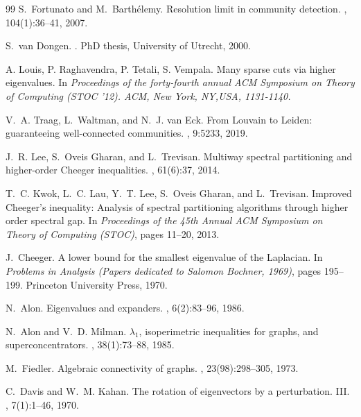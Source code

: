 \documentclass{article}
\theoremstyle{definition}
\theoremstyle{remark}
\begin{document}
\begin{thebibliography}{99}
S.~Fortunato and M.~Barth\'elemy.
\newblock Resolution limit in community detection.
,
  104(1):36--41, 2007.

S.~van Dongen.
.
\newblock PhD thesis, University of Utrecht, 2000.

A. Louis, P. Raghavendra, P. Tetali, S. Vempala.
\newblock Many sparse cuts via higher eigenvalues. 
\newblock In {\em Proceedings of the forty-fourth annual ACM Symposium on Theory of Computing (STOC ’12). ACM, New York, NY,USA, 1131-1140.}

V.~A. Traag, L.~Waltman, and N.~J. van Eck.
\newblock From {L}ouvain to {L}eiden: guaranteeing well-connected communities.
, 9:5233, 2019.

J.~R. Lee, S.~Oveis Gharan, and L.~Trevisan.
\newblock Multiway spectral partitioning and higher-order {C}heeger
  inequalities.
, 61(6):37, 2014.

T.~C. Kwok, L.~C. Lau, Y.~T. Lee, S.~Oveis Gharan, and L.~Trevisan.
\newblock Improved {C}heeger's inequality: Analysis of spectral partitioning
  algorithms through higher order spectral gap.
\newblock In {\em Proceedings of the 45th Annual ACM Symposium on Theory of
  Computing (STOC)}, pages 11--20, 2013.

J.~Cheeger.
\newblock A lower bound for the smallest eigenvalue of the {L}aplacian.
\newblock In {\em Problems in Analysis (Papers dedicated to Salomon
  Bochner, 1969)}, pages 195--199. Princeton University Press, 1970.

N.~Alon.
\newblock Eigenvalues and expanders.
, 6(2):83--96, 1986.

N.~Alon and V.~D. Milman.
\newblock $\lambda_1$, isoperimetric inequalities for graphs, and
  superconcentrators.
, 38(1):73--88, 1985.

M.~Fiedler.
\newblock Algebraic connectivity of graphs.
, 23(98):298--305, 1973.

C.~Davis and W.~M. Kahan.
\newblock The rotation of eigenvectors by a perturbation. {III}.
, 7(1):1--46, 1970.


\end{thebibliography}
\end{document}
